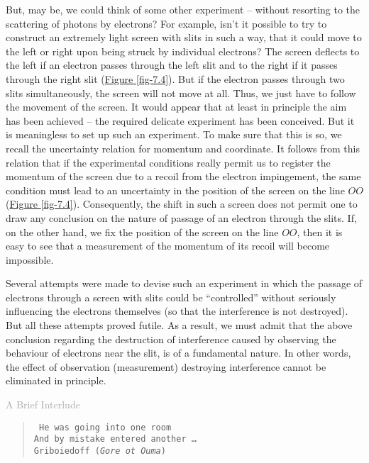 \documentclass[a4paper,sfsidenotes,colorlinks=true]{tufte-book}
\numberwithin{equation}{section}
\numberwithin{figure}{section}
\begin{document}
But, may be, we could think of some other experiment -- without resorting to the scattering of photons by electrons? For example, isn't it possible to try to construct an extremely light screen with slits in such a way, that it could move to the left or right upon being struck by individual electrons? The screen deflects to the left if an electron passes through the left slit and to the right if it passes through the right slit (\hyperref[fig-7.4]{Figure \ref{fig-7.4}}). But if the electron passes through two slits simultaneously, the screen will not move at all. Thus, we just have to follow the movement of the screen. It would appear that at least in principle the aim has been achieved -- the required delicate experiment has been conceived. But it is meaningless to set up such an experiment. To make sure that this is so, we recall the uncertainty relation for momentum and coordinate. It follows from this relation that if the experimental conditions really permit us to register the momentum of the screen due to a recoil from the electron impingement, the same condition must lead to an uncertainty in the position of the screen on the line $OO$ (\hyperref[fig-7.4]{Figure \ref{fig-7.4}}). Consequently, the shift in such a screen does not permit one to draw any conclusion on the nature of passage of an electron through the slits. If, on the other hand, we fix the position of the screen on the line $OO$, then it is easy to see that a measurement of the momentum of its recoil will become impossible.


Several attempts were made to devise such an experiment in which the passage of electrons through a screen with slits could be ``controlled'' without seriously influencing the electrons themselves (so that the interference is not destroyed). But all these attempts proved futile. As a result, we must admit that the above conclusion regarding the destruction of interference caused by observing the behaviour of electrons near the slit, is of a fundamental nature. In other words, the effect of observation (measurement) destroying interference cannot be eliminated in principle.

\clearpage

\textsf{\Large \textcolor{darkgray}{A Brief Interlude}}

\vspace*{10pt}
\begin{verse}
\texttt{\small
He was going into one room \\
And by mistake entered another \ldots \\[5pt]
Griboiedoff (\emph{Gore ot Ouma})}
\end{verse}
\end{document}
